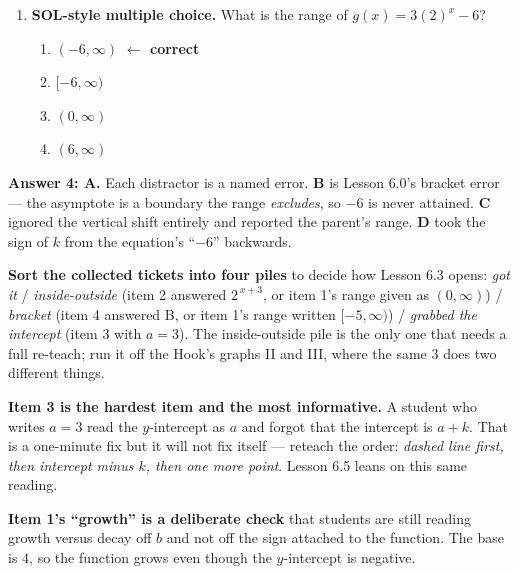 \documentclass[10pt]{article}
\begin{document}
\begin{enumerate}[leftmargin=1.8em, itemsep=9pt]
  \item \textbf{SOL-style multiple choice.} What is the range of $g(x)=3(2)^{x}-6$?
        \begin{enumerate}[label=\Alph*., leftmargin=1.9em, itemsep=1pt]
          \item $(-6,\infty)$ \quad \textcolor{keyred}{\textbf{$\leftarrow$ correct}}
          \item $[-6,\infty)$
          \item $(0,\infty)$
          \item $(6,\infty)$
        \end{enumerate}
\end{enumerate}

\begin{teachernote}
\textbf{Answer 4: A.} Each distractor is a named error. \textbf{B} is Lesson 6.0's bracket error --- the
asymptote is a boundary the range \emph{excludes}, so $-6$ is never attained. \textbf{C} ignored the
vertical shift entirely and reported the parent's range. \textbf{D} took the sign of $k$ from the
equation's ``$-6$'' backwards.

\textbf{Sort the collected tickets into four piles} to decide how Lesson 6.3 opens:
\emph{got it} / \emph{inside-outside} (item 2 answered $2^{\,x+3}$, or item 1's range given as
$(0,\infty)$) / \emph{bracket} (item 4 answered B, or item 1's range written $[-5,\infty)$) /
\emph{grabbed the intercept} (item 3 with $a=3$). The inside-outside pile is the only one that needs a
full re-teach; run it off the Hook's graphs II and III, where the same $3$ does two different things.

\textbf{Item 3 is the hardest item and the most informative.} A student who writes $a=3$ read the
$y$-intercept as $a$ and forgot that the intercept is $a+k$. That is a one-minute fix but it will not
fix itself --- reteach the order: \emph{dashed line first, then intercept minus $k$, then one more
point}. Lesson 6.5 leans on this same reading.

\textbf{Item 1's ``growth'' is a deliberate check} that students are still reading growth versus decay
off $b$ and not off the sign attached to the function. The base is $4$, so the function grows even
though the $y$-intercept is negative.
\end{teachernote}
\end{document}
